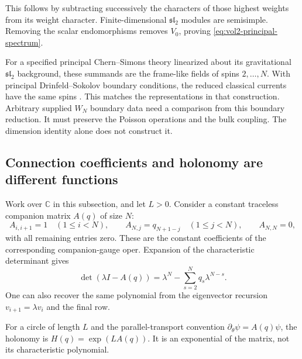 This follows by subtracting successively the characters of those
highest weights from its weight character. Finite-dimensional
$\mathfrak{sl}_2$ modules are semisimple.
Removing the scalar endomorphisms removes $V_0$, proving
\eqref{eq:vol2-principal-spectrum}.

For a specified principal Chern--Simons theory linearized about
its gravitational $\mathfrak{sl}_2$ background, these summands
are the frame-like fields of spins $2,\ldots,N$.
With principal Drinfeld--Sokolov boundary conditions, the reduced
classical currents have the same spins
\cite{CampoleoniHigherSpin,HenneauxRey}.
This matches the representations in that construction.
Arbitrary supplied $W_N$ boundary data need a comparison from this
boundary reduction.
It must preserve the Poisson operations and the bulk coupling.
The dimension identity alone does not construct it.

\subsection{Connection coefficients and holonomy are different functions}

Work over $\mathbb C$ in this subsection, and let $L>0$.
Consider a constant traceless companion matrix $A(q)$ of size $N$:
\[
 A_{i,i+1}=1\quad(1\le i<N),\qquad
 A_{N,j}=q_{N+1-j}\quad(1\le j<N),\qquad A_{N,N}=0,
\]
with all remaining entries zero.
These are the constant coefficients of the corresponding
companion-gauge oper.
Expansion of the characteristic determinant gives
\begin{equation}\label{eq:vol2-companion-polynomial}
 \det(\lambda I-A(q))
   =\lambda^N-\sum_{s=2}^{N}q_s\lambda^{N-s}.
\end{equation}
One can also recover the same polynomial from the eigenvector
recursion $v_{i+1}=\lambda v_i$ and the final row.

For a circle of length $L$ and the parallel-transport convention
$\partial_\theta\psi=A(q)\psi$, the holonomy is
$H(q)=\exp(LA(q))$.
It is an exponential of the matrix, not its characteristic
polynomial.

